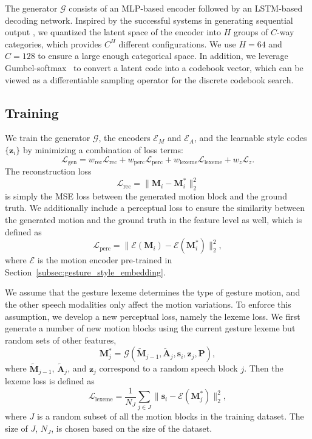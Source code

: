 \documentclass[acmtog,authorversion]{acmart}
\newcommand{\vect}[1]{\bm{#1}}
\newcommand{\tildevect}[1]{\vect{\tilde{#1}}}
\newcommand{\eqword}[1]{{\text{#1}}}
\begin{document}
The generator $\mathcal{G}$ consists of an MLP-based encoder followed by an LSTM-based decoding network. Inspired by the successful systems in generating sequential output \cite{richard2021meshtalk,oord2017neural}, we quantized the latent space of the encoder into $H$ groups of $C$-way categories, which provides $C^H$ different configurations. We use $H=64$ and $C=128$ to ensure a large enough categorical space. In addition, we leverage Gumbel-softmax~\cite{jang2017categorical} to convert a latent code into a codebook vector, which can be viewed as a differentiable sampling operator for the discrete codebook search.

\subsection{Training}
We train the generator $\mathcal{G}$, the encoders $\mathcal{E}_M$ and $\mathcal{E}_A$, and the learnable style codes $\{\vect{z}_i\}$ by minimizing a combination of loss terms:
\begin{equation}
    \mathcal{L}_{\eqword{gen}} 
    = w_{\eqword{rec}}\mathcal{L}_{\eqword{rec}}
    + w_{\eqword{perc}}\mathcal{L}_{\eqword{perc}}
    + w_{\eqword{lexeme}}\mathcal{L}_{\eqword{lexeme}}
    + w_{{z}}\mathcal{L}_{{z}}.\label{eqn:generator_loss}
\end{equation}
The reconstruction loss 
\begin{equation}
    \mathcal{L}_{\eqword{rec}}=\lVert \vect{M}_i - \vect{M}_i^* \rVert_2^2   
\end{equation}
is simply the MSE loss between the generated motion block and the ground truth. We additionally include a perceptual loss to ensure the similarity between the generated motion and the ground truth in the feature level as well, which is defined as
\begin{equation}
    \mathcal{L}_{\eqword{perc}} = \lVert \mathcal{E}(\vect{M}_i) - \mathcal{E}(\vect{M}_i^*) \rVert_2^2 ,
\end{equation}
where $\mathcal{E}$ is the motion encoder pre-trained in Section~\ref{subsec:gesture_style_embedding}.

We assume that the gesture lexeme determines the type of gesture motion, and the other speech modalities only affect the motion variations. To enforce this assumption, we develop a new perceptual loss, namely the lexeme loss. We first generate a number of new motion blocks using the current gesture lexeme but random sets of other features, 
\begin{equation}
    \vect{M}^{*}_j = \mathcal{G}(\tildevect{M}_{j-1}, \tildevect{A}_{j}, \vect{s}_i, \vect{z}_j, \vect{P}) ,
\end{equation}
where $\tildevect{M}_{j-1}$, $\tildevect{A}_{j}$, and $\vect{z}_j$ correspond to a random speech block $j$. Then the lexeme loss is defined as 
\begin{equation}
    \mathcal{L}_{\eqword{lexeme}}=\frac{1}{N_J}\sum_{j\in{}J}\lVert \vect{s}_i - \mathcal{E}(\vect{M}_j^*) \rVert_2^2 ,
\end{equation}
where $J$ is a random subset of all the motion blocks in the training dataset. The size of $J$, $N_J$, is chosen based on the size of the dataset.
\end{document}
